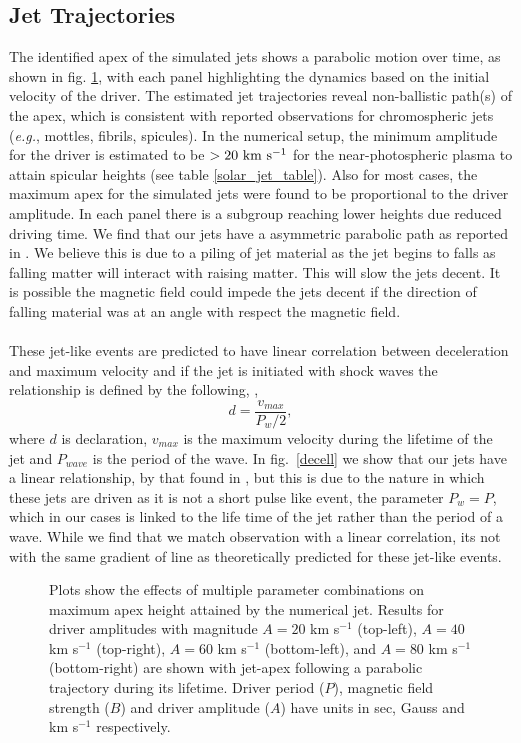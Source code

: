\documentclass[12pt]{ociamthesis}
\newcommand{\np}{\\ \\}
\begin{document}
\subsection{Jet Trajectories}
\label{subsec:jet_traj}
The identified apex of the simulated jets shows a parabolic motion over time, as shown in fig. \ref{jet_traj}, with each panel highlighting the dynamics based on the initial velocity of the driver. The estimated jet trajectories reveal non-ballistic path(s) of the apex, which is consistent with reported observations \citep{Hansteen2006ApJ, Rouppe2007ApJ660L169R, Pontieu2007PASJ} for chromospheric jets (\textit{e.g.}, mottles, fibrils, spicules). In the numerical setup, the minimum amplitude for the driver is estimated to be $>20 ~\rm{km ~s^{-1}}$ for the near-photospheric plasma to attain spicular heights (see table \ref{solar_jet_table}). Also for most cases, the maximum apex for the simulated jets were found to be proportional to the driver amplitude. In each panel there is a subgroup reaching lower heights due reduced driving time. We find that our jets have a asymmetric parabolic path as reported in \cite{Singh2019}. We believe this is due to a piling of jet material as the jet begins to falls as falling matter will interact with raising matter. This will slow the jets decent. It is possible the magnetic field could impede the jets decent if the direction of falling material was at an angle with respect the magnetic field.
\np  
%
These jet-like events are predicted to have linear correlation between deceleration and maximum velocity and if the jet is initiated with shock waves the relationship is defined by the following, \citep{Heggland2007ApJ6661277H},
\begin{equation} \label{trend_heg}
d = \frac{v_{max}}{P_{w}/2},
\end{equation}
where $d$ is declaration, $v_{max}$ is the maximum velocity during the lifetime of the jet and $P_{wave}$ is the period of the wave. In fig.~\ref{decell} we show that our jets have a linear relationship, by that found in \citep{Heggland2007ApJ6661277H}, but this is due to the nature in which these jets are driven as it is not a short pulse like event, the parameter $P_{w}=P$, which in our cases is linked to the life time of the jet rather than the period of a wave. While we find that we match observation with a linear correlation, its not with the same gradient of line as theoretically predicted for these jet-like events. 
\begin{figure}
\captionsetup[subfigure]{labelformat=empty}
\centering
{} 
\caption{Plots show the effects of multiple parameter combinations on maximum apex height attained by the numerical jet. Results for driver amplitudes with magnitude $A = 20$ km s$^{-1}$ (top-left), $A = 40$ km s$^{-1}$ (top-right), $A = 60$ km s$^{-1}$ (bottom-left), and $A = 80$ km s$^{-1}$ (bottom-right) are shown with jet-apex following a parabolic trajectory during its lifetime. Driver period ($P$), magnetic field strength ($B$) and driver amplitude ($A$) have units in sec, Gauss and km s$^{-1}$ respectively.}
\label{jet_traj}
\end{figure}
\end{document}
